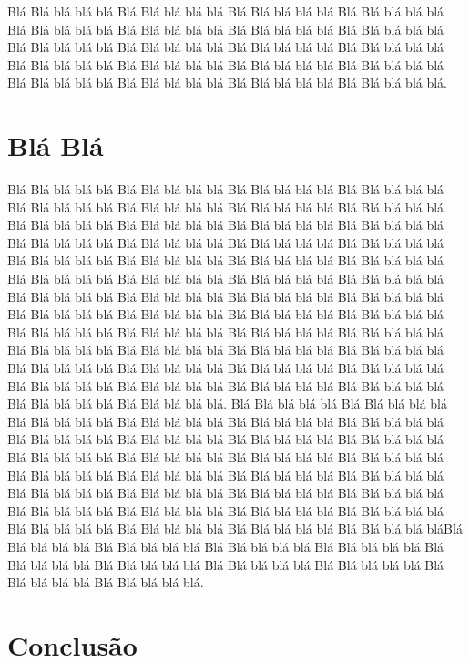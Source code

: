 \documentclass[times, 10pt,twocolumn]{article}
\begin{document}
Blá Blá blá blá blá Blá Blá blá blá blá Blá Blá blá blá blá Blá Blá blá blá blá Blá Blá blá blá blá Blá Blá blá blá blá Blá Blá blá blá blá Blá Blá blá blá blá Blá Blá blá blá blá Blá Blá blá blá blá
Blá Blá blá blá blá Blá Blá blá blá blá Blá Blá blá blá blá Blá Blá blá blá blá Blá Blá blá blá blá Blá Blá blá blá blá Blá Blá blá blá blá Blá Blá blá blá blá Blá Blá blá blá blá Blá Blá blá blá blá.

\section{Blá Blá}
Blá Blá blá blá blá Blá Blá blá blá blá Blá Blá blá blá blá Blá Blá blá blá blá Blá Blá blá blá blá Blá Blá blá blá blá Blá Blá blá blá blá Blá Blá blá blá blá Blá Blá blá blá blá Blá Blá blá blá blá
Blá Blá blá blá blá Blá Blá blá blá blá Blá Blá blá blá blá Blá Blá blá blá blá Blá Blá blá blá blá Blá Blá blá blá blá Blá Blá blá blá blá Blá Blá blá blá blá Blá Blá blá blá blá Blá Blá blá blá blá
Blá Blá blá blá blá Blá Blá blá blá blá Blá Blá blá blá blá Blá Blá blá blá blá Blá Blá blá blá blá Blá Blá blá blá blá Blá Blá blá blá blá Blá Blá blá blá blá Blá Blá blá blá blá Blá Blá blá blá blá
Blá Blá blá blá blá Blá Blá blá blá blá Blá Blá blá blá blá Blá Blá blá blá blá Blá Blá blá blá blá Blá Blá blá blá blá Blá Blá blá blá blá Blá Blá blá blá blá Blá Blá blá blá blá Blá Blá blá blá blá
Blá Blá blá blá blá Blá Blá blá blá blá Blá Blá blá blá blá Blá Blá blá blá blá Blá Blá blá blá blá Blá Blá blá blá blá Blá Blá blá blá blá Blá Blá blá blá blá Blá Blá blá blá blá Blá Blá blá blá blá. 
Blá Blá blá blá blá Blá Blá blá blá blá Blá Blá blá blá blá Blá Blá blá blá blá Blá Blá blá blá blá Blá Blá blá blá blá Blá Blá blá blá blá Blá Blá blá blá blá Blá Blá blá blá blá Blá Blá blá blá blá
Blá Blá blá blá blá Blá Blá blá blá blá Blá Blá blá blá blá Blá Blá blá blá blá Blá Blá blá blá blá Blá Blá blá blá blá Blá Blá blá blá blá Blá Blá blá blá blá Blá Blá blá blá blá Blá Blá blá blá blá
Blá Blá blá blá blá Blá Blá blá blá blá Blá Blá blá blá blá Blá Blá blá blá blá Blá Blá blá blá blá Blá Blá blá blá blá Blá Blá blá blá blá Blá Blá blá blá blá Blá Blá blá blá blá Blá Blá blá blá bláBlá Blá blá blá blá Blá Blá blá blá blá Blá Blá blá blá blá Blá Blá blá blá blá Blá Blá blá blá blá Blá Blá blá blá blá Blá Blá blá blá blá Blá Blá blá blá blá Blá Blá blá blá blá Blá Blá blá blá blá.

\section{Conclusão}
\end{document}
